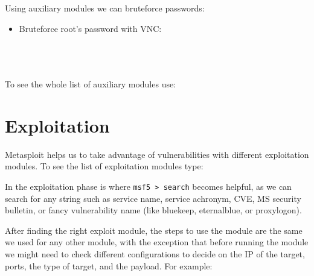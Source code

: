 Using auxiliary modules we can bruteforce passwords:

\begin{itemize}
    \item Bruteforce root's password with VNC:\\
     \\
     \\
     \\
\end{itemize}

\begin{tipbox}[frametitle=Tip: Displaying all auxiliary modules]
    To see the whole list of auxiliary modules use: \\
\end{tipbox}

\section{Exploitation}

Metasploit helps us to take advantage of vulnerabilities with different exploitation modules. To see the list of exploitation modules type: 


In the exploitation phase is where \texttt{msf5 > search} becomes helpful, as we can search for any string such as service name, service achronym, CVE, MS security bulletin, or fancy vulnerability name (like bluekeep, eternalblue, or proxylogon).

After finding the right exploit module, the steps to use the module are the same we used for any other module, with the exception that before running the module we might need to check different configurations to decide on the IP of the target, ports, the type of target, and the payload. For example:


